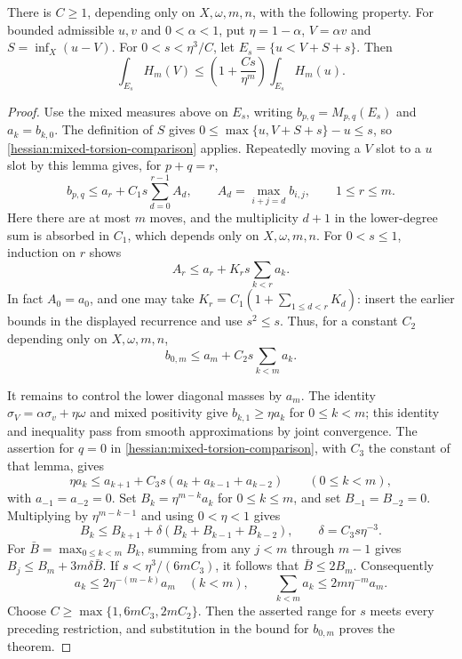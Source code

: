 \begin{theorem}\label{hessian:weak-modified-comparison}
There is $C\geq1$, depending only on $X,\omega,m,n$, with the
following property. For bounded admissible $u,v$ and $0<\alpha<1$,
put $\eta=1-\alpha$, $V=\alpha v$ and $S=\inf_X(u-V)$.
For $0<s<\eta^3/C$, let $E_s=\{u<V+S+s\}$. Then
\[
 \int_{E_s}H_m(V)
       \leq\left(1+\frac{Cs}{\eta^m}\right)
                                  \int_{E_s}H_m(u).
\]
\end{theorem}
\begin{proof}
Use the mixed measures above on $E_s$, writing
$b_{p,q}=M_{p,q}(E_s)$ and $a_k=b_{k,0}$.
The definition of $S$ gives
$0\leq\max\{u,V+S+s\}-u\leq s$, so \cref{hessian:mixed-torsion-comparison} applies.
Repeatedly moving a $V$ slot to a $u$ slot by this lemma gives,
for $p+q=r$,
\[
 b_{p,q}\leq a_r+C_1s\sum_{d=0}^{r-1}A_d,
 \qquad A_d=\max_{i+j=d}b_{i,j},\qquad 1\leq r\leq m.
\]
Here there are at most $m$ moves, and the multiplicity $d+1$
in the lower-degree sum is absorbed in $C_1$, which depends only
on $X,\omega,m,n$.
For $0<s\leq1$, induction on $r$ shows
\[
 A_r\leq a_r+K_rs\sum_{k<r}a_k.
\]
In fact $A_0=a_0$, and one may take
$K_r=C_1(1+\sum_{1\leq d<r}K_d)$: insert the earlier bounds
in the displayed recurrence and use $s^2\leq s$.
Thus, for a constant $C_2$ depending only on $X,\omega,m,n$,
\[
 b_{0,m}\leq a_m+C_2s\sum_{k<m}a_k.
\]

It remains to control the lower diagonal masses by $a_m$.
The identity $\sigma_V=\alpha\sigma_v+\eta\omega$ and mixed
positivity give $b_{k,1}\geq\eta a_k$ for $0\leq k<m$; this identity
and inequality pass from smooth approximations by joint convergence.
The assertion for $q=0$ in \cref{hessian:mixed-torsion-comparison},
with $C_3$ the constant of that lemma, gives
\[
 \eta a_k\leq a_{k+1}
          +C_3s(a_k+a_{k-1}+a_{k-2})\qquad(0\leq k<m),
\]
with $a_{-1}=a_{-2}=0$.
Set $B_k=\eta^{m-k}a_k$ for $0\leq k\leq m$, and set
$B_{-1}=B_{-2}=0$. Multiplying by $\eta^{m-k-1}$ and using
$0<\eta<1$ gives
\[
 B_k\leq B_{k+1}
          +\delta(B_k+B_{k-1}+B_{k-2}),
 \qquad\delta=C_3s\eta^{-3}.
\]
For $\bar B=\max_{0\leq k<m}B_k$, summing from any $j<m$ through
$m-1$ gives $B_j\leq B_m+3m\delta\bar B$.
If $s<\eta^3/(6mC_3)$, it follows that $\bar B\leq2B_m$.
Consequently
\[
 a_k\leq2\eta^{-(m-k)}a_m\quad(k<m),\qquad
 \sum_{k<m}a_k\leq2m\eta^{-m}a_m.
\]
Choose $C\geq\max\{1,6mC_3,2mC_2\}$. Then the asserted
range for $s$ meets every preceding restriction, and substitution
in the bound for $b_{0,m}$ proves the theorem.
\end{proof}

